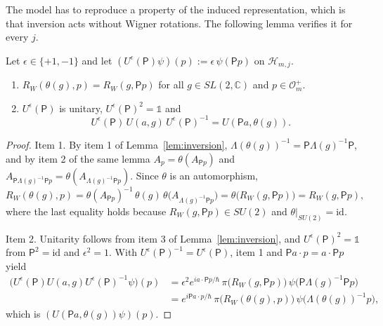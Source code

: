 The model has to reproduce a property of the induced representation, which is that inversion acts without Wigner rotations. The following lemma verifies it for every $j$.

\begin{lemma}\label{lem:parity-induced}
	Let $\epsilon\in\{+1,-1\}$ and let $(U^\epsilon(\mathsf{P})\psi)(p):=\epsilon\,\psi(\mathsf{P}p)$ on $\mathcal{H}_{m,j}$.
	\begin{enumerate}
		\item $R_W(\theta(g),p)=R_W(g,\mathsf{P}p)$ for all $g\in SL(2,\mathbb{C})$ and $p\in\mathcal{O}_m^+$.
		\item $U^\epsilon(\mathsf{P})$ is unitary, $U^\epsilon(\mathsf{P})^2=\mathbb{1}$ and
		\begin{equation}\label{eq:parity-covariance-induced}
			U^\epsilon(\mathsf{P})\,U(a,g)\,U^\epsilon(\mathsf{P})^{-1}=U(\mathsf{P}a,\theta(g)).
		\end{equation}
	\end{enumerate}
\end{lemma}

\begin{proof}
	Item 1. By item 1 of Lemma~\ref{lem:inversion}, $\Lambda(\theta(g))^{-1}=\mathsf{P}\Lambda(g)^{-1}\mathsf{P}$, and by item 2 of the same lemma $A_p=\theta(A_{\mathsf{P}p})$ and $A_{\mathsf{P}\Lambda(g)^{-1}\mathsf{P}p}=\theta(A_{\Lambda(g)^{-1}\mathsf{P}p})$. Since $\theta$ is an automorphism,
	\begin{equation*}
		R_W(\theta(g),p)=\theta(A_{\mathsf{P}p})^{-1}\,\theta(g)\,\theta\big(A_{\Lambda(g)^{-1}\mathsf{P}p}\big)=\theta\big(R_W(g,\mathsf{P}p)\big)=R_W(g,\mathsf{P}p),
	\end{equation*}
	where the last equality holds because $R_W(g,\mathsf{P}p)\in SU(2)$ and $\theta|_{SU(2)}=\mathrm{id}$.
	
	Item 2. Unitarity follows from item 3 of Lemma~\ref{lem:inversion}, and $U^\epsilon(\mathsf{P})^2=\mathbb{1}$ from $\mathsf{P}^2=\mathrm{id}$ and $\epsilon^2=1$. With $U^\epsilon(\mathsf{P})^{-1}=U^\epsilon(\mathsf{P})$, item 1 and $\mathsf{P}a\cdot p=a\cdot\mathsf{P}p$ yield
	\begin{align*}
		\big(U^\epsilon(\mathsf{P})U(a,g)U^\epsilon(\mathsf{P})^{-1}\psi\big)(p)&=\epsilon^2e^{ia\cdot\mathsf{P}p/\hbar}\,\pi\big(R_W(g,\mathsf{P}p)\big)\,\psi\big(\mathsf{P}\Lambda(g)^{-1}\mathsf{P}p\big)\\
		&=e^{i\mathsf{P}a\cdot p/\hbar}\,\pi\big(R_W(\theta(g),p)\big)\,\psi\big(\Lambda(\theta(g))^{-1}p\big),
	\end{align*}
	which is $(U(\mathsf{P}a,\theta(g))\psi)(p)$.
\end{proof}

